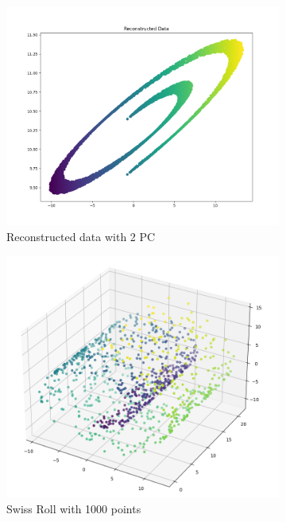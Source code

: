 \begin{figure}[H]
\centering
    \begin{subfigure}{.4\textwidth}
        \includegraphics[width=\linewidth]{images/task2_reconstructedPCA.png}
        \caption{Reconstructed data with 2 PC}
        \label{fig:task2_PCA}
    \end{subfigure}
    \begin{subfigure}{.4\textwidth}
        \includegraphics[width=\linewidth]{images/ex3task2_swissRoll1000.png}
        \caption{Swiss Roll with 1000 points}
        \label{fig:task2_Swiss_1000}
    \end{subfigure}
    
    \caption{}
    \label{fig:task2_PCA_1000}
\end{figure}
